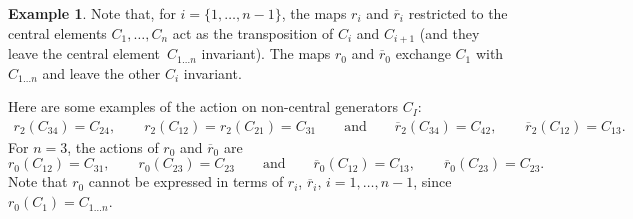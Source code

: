 \documentclass[10pt,a4paper]{amsart}
\numberwithin{equation}{section}
\theoremstyle{definition}
\newtheorem{exam}[theo]{Example}
\newcommand{\rb}{\overline{r}}
\begin{document}
\begin{exam}
Note that, for $i=\{1,\dots,n-1\}$, the maps $r_i$ and $\rb_i$ restricted to the central elements $C_1,\dots,C_n$ act as the transposition of $C_i$ and $C_{i+1}$ (and they leave the central element~$C_{1\dots n}$ invariant). The maps $r_0$ and $\rb_0$ exchange $C_1$ with $C_{1\dots n}$ and leave the other $C_i$ invariant.

Here are some examples of the action on non-central generators $C_I$:
\begin{gather*}
r_2(C_{34})=C_{24} ,\qquad\! r_2(C_{12})=r_2(C_{21})=C_{31}\qquad\! \text{and}\qquad\! \rb_2(C_{34})=C_{42} ,\qquad\! \rb_2(C_{12})=C_{13}.
\end{gather*}
For $n=3$, the actions of $r_0$ and $\rb_0$ are
\[
r_0(C_{12})=C_{31} ,\qquad r_0(C_{23})=C_{23}\qquad \text{and}\qquad \rb_0(C_{12})=C_{13} ,\qquad \rb_0(C_{23})=C_{23}.
\]
Note that $r_0$ cannot be expressed in terms of $r_i$, $\rb_i$, $i=1,\dots,n-1$, since $r_0(C_1)=C_{1\dots n}$.
\end{exam}
\end{document}
